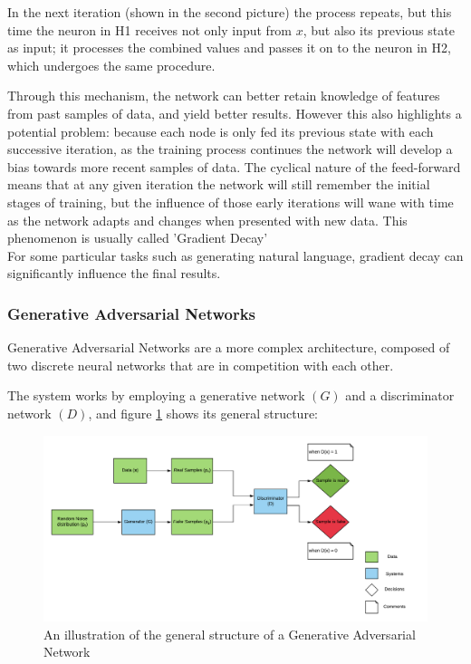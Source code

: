 In the next iteration (shown in the second picture) the process repeats, but this time the neuron in H1 receives not only input from $x$, but also its previous state as input; it processes the combined values and passes it on to the neuron in H2, which undergoes the same procedure.

Through this mechanism, the network can better retain knowledge of features from past samples of data, and yield better results.
However this also highlights a potential problem: because each node is only fed its previous state with each successive iteration, as the training process continues the network will develop a bias towards more recent samples of data.
 The cyclical nature of the feed-forward means that at any given iteration the network will still remember the initial stages of training, but the influence of those early iterations will wane with time as the network adapts and changes when presented with new data. This phenomenon is usually called 'Gradient Decay'\\
For some particular tasks such as generating natural language, gradient decay can significantly influence the final results.

\subsubsection{Generative Adversarial Networks}\label{subsubsec:gans}
Generative Adversarial Networks are a more complex architecture, composed of two discrete neural networks that are in competition with each other.

The system works by employing a generative network $(G)$ and a discriminator network $(D)$, and figure \ref{fig:gan-diagram} shows its general structure:

\begin{figure}[H]
\centering
    \includegraphics[scale=0.55]{figures/GAN_v4.png}
    \caption{An illustration of the general structure of a Generative Adversarial Network}
    \label{fig:gan-diagram}
\end{figure}    

